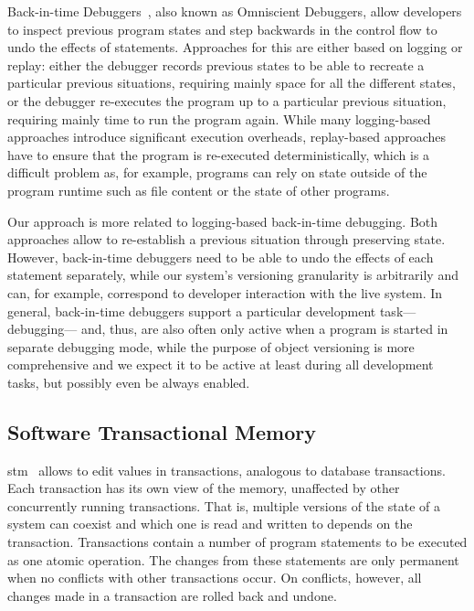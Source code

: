 Back-in-time Debuggers~\cite{Lewis2003BIT}, also known as Omniscient Debuggers, allow developers to inspect previous program states and step backwards in the control flow to undo the effects of statements.
Approaches for this are either based on logging or replay: either the debugger records previous states to be able to recreate a particular previous situations, requiring mainly space for all the different states, or the debugger re-executes the program up to a particular previous situation, requiring mainly time to run the program again.
While many logging-based approaches introduce significant execution overheads, replay-based approaches have to ensure that the program is re-executed deterministically, which is a difficult problem as, for example, programs can rely on state outside of the program runtime such as file content or the state of other programs.

Our approach is more related to logging-based back-in-time debugging.
Both approaches allow to re-establish a previous situation through preserving state.
However, back-in-time debuggers need to be able to undo the effects of each statement separately, while our system's versioning granularity is arbitrarily and can, for example, correspond to developer interaction with the live system.
In general, back-in-time debuggers support a particular development task---debugging--- and, thus, are also often only active when a program is started in separate debugging mode, while the purpose of object versioning is more comprehensive and we expect it to be active at least during all development tasks, but possibly even be always enabled.


\subsection{Software Transactional Memory}

\ac{stm}~\cite{Shavit1995STM} allows to edit values in transactions, analogous to database transactions.
Each transaction has its own view of the memory, unaffected by other concurrently running transactions.
That is, multiple versions of the state of a system can coexist and which one is read and written to depends on the transaction.
Transactions contain a number of program statements to be executed as one atomic operation.
The changes from these statements are only permanent when no conflicts with other transactions occur.
On conflicts, however, all changes made in a transaction are rolled back and undone.

